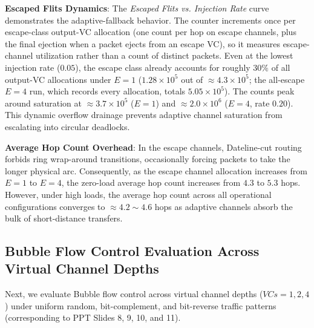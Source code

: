 \documentclass[10pt,journal,compsoc]{IEEEtran}
\begin{document}
\textbf{Escaped Flits Dynamics}: The \textit{Escaped Flits vs. Injection Rate} curve demonstrates the adaptive-fallback behavior. The counter increments once per escape-class output-VC allocation (one count per hop on escape channels, plus the final ejection when a packet ejects from an escape VC), so it measures escape-channel utilization rather than a count of distinct packets. Even at the lowest injection rate ($0.05$), the escape class already accounts for roughly $30\%$ of all output-VC allocations under $E=1$ ($1.28 \times 10^5$ out of $\approx 4.3 \times 10^5$; the all-escape $E=4$ run, which records every allocation, totals $5.05 \times 10^5$). The counts peak around saturation at $\approx 3.7 \times 10^5$ ($E=1$) and $\approx 2.0 \times 10^6$ ($E=4$, rate $0.20$). This dynamic overflow drainage prevents adaptive channel saturation from escalating into circular deadlocks.

\textbf{Average Hop Count Overhead}: In the escape channels, Dateline-cut routing forbids ring wrap-around transitions, occasionally forcing packets to take the longer physical arc. Consequently, as the escape channel allocation increases from $E=1$ to $E=4$, the zero-load average hop count increases from $4.3$ to $5.3$ hops. However, under high loads, the average hop count across all operational configurations converges to $\approx 4.2 \sim 4.6$ hops as adaptive channels absorb the bulk of short-distance transfers.

\subsection{Bubble Flow Control Evaluation Across Virtual Channel Depths}
Next, we evaluate Bubble flow control across virtual channel depths ($VCs=1, 2, 4$) under uniform random, bit-complement, and bit-reverse traffic patterns (corresponding to PPT Slides 8, 9, 10, and 11).
\end{document}
